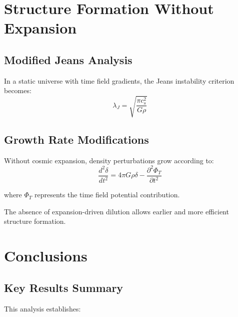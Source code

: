 \documentclass[12pt,a4paper]{article}
\begin{document}
	\section{Structure Formation Without Expansion}
	\label{sec:structure_formation}
	
	\subsection{Modified Jeans Analysis}
	\label{subsec:jeans_analysis}
	
	In a static universe with time field gradients, the Jeans instability criterion becomes:
	\begin{equation}
		\lambda_J = \sqrt{\frac{\pi c_s^2}{G \rho}}
	\end{equation}
	
	\subsection{Growth Rate Modifications}
	\label{subsec:growth_modifications}
	
	Without cosmic expansion, density perturbations grow according to:
	\begin{equation}
		\frac{d^2 \delta}{dt^2} = 4\pi G \rho \delta - \frac{\partial^2 \Phi_T}{\partial t^2}
	\end{equation}
	
	where $\Phi_T$ represents the time field potential contribution.
	
	The absence of expansion-driven dilution allows earlier and more efficient structure formation.
	
	\section{Conclusions}
	\label{sec:conclusions}
	
	\subsection{Key Results Summary}
	\label{subsec:key_results}
	
	This analysis establishes:
	
\end{document}
